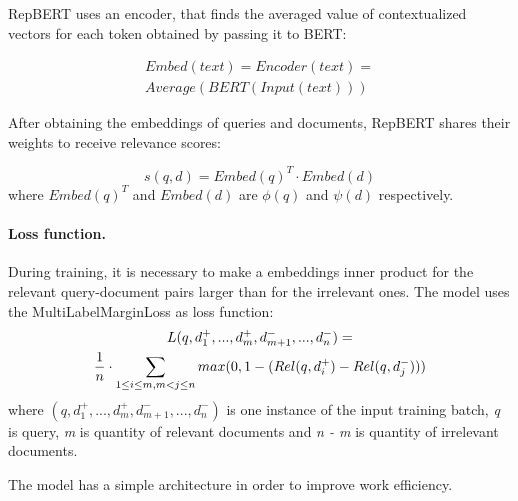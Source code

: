 \documentclass[
    twocolumn,
]{ceurart}
\begin{document}
    RepBERT uses an encoder, that finds the averaged value of contextualized vectors for each token
    obtained by passing it to BERT:

    \begin{multline}
        Embed(text)=Encoder(text)=\\
        Average(BERT(Input(text)))
    \end{multline}

    After obtaining the embeddings of queries and documents, RepBERT shares their weights
    to receive relevance scores:

    \begin{equation}
        s(q,d) = Embed(q)^T \cdot Embed(d)
    \end{equation}
    where $Embed(q)^T$ and $Embed(d)$ are $\phi(q)$ and $\psi(d)$ respectively.

    \paragraph{Loss function.}
    During training, it is necessary to make a embeddings inner product for the relevant
    query-document pairs larger than for the irrelevant ones.
    The model uses the MultiLabelMarginLoss \cite{multiLabelMarginLoss} as loss function:
    \begin{multline}
        \mathnormal{L}(q,d_1^+,...,d_m^+,d_{m+1}^-,...,d_n^-) = \\
        \frac{1}{n} \cdot \sum_{1 \leq i \leq m,m < j \leq n}
        max(0, 1 - (Rel(q,d_i^+) - Rel(q,d_j^-)))
    \end{multline}
    where $(q,d_1^+,...,d_m^+,d_{m+1}^-,...,d_n^-)$ is one instance of the input training batch,
    \emph{q} is query, \emph{m} is quantity of relevant documents and \emph{n - m} is quantity
    of irrelevant documents\cite{RepBERT}.\\\par
    The model has a simple architecture in order to improve work efficiency.

\end{document}

